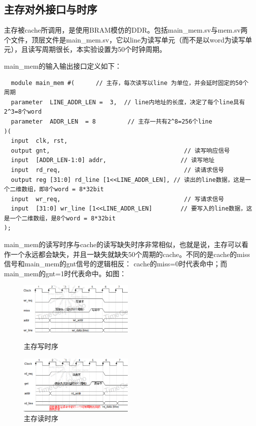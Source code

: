 \documentclass{ctexart}
\begin{document}
\subsection{\hei 主存对外接口与时序}
主存被cache所调用，是使用BRAM模仿的DDR。包括main\_mem.sv与mem.sv两个文件，顶层文件是main\_mem.sv，它以line为读写单元（而不是以word为读写单元），且读写周期很长，本实验设置为50个时钟周期。
\par main\_mem的输入输出接口定义如下：
\begin{lstlisting}
  module main_mem #(      // 主存，每次读写以line 为单位，并会延时固定的50个周期
  parameter  LINE_ADDR_LEN =  3,  // line内地址的长度，决定了每个line具有2^3=8个word
  parameter  ADDR_LEN  = 8         // 主存一共有2^8=256个line
)(
  input  clk, rst,
  output gnt,                                      // 读写响应信号
  input  [ADDR_LEN-1:0] addr,                     // 读写地址
  input  rd_req,                                   // 读请求信号
  output reg [31:0] rd_line [1<<LINE_ADDR_LEN], // 读出的line数据，这是一个二维数组，即8个word = 8*32bit
  input  wr_req,                                   // 写请求信号
  input  [31:0] wr_line [1<<LINE_ADDR_LEN]        // 要写入的line数据，这是一个二维数组，是8个word = 8*32bit
);

\end{lstlisting}\par
main\_mem的读写时序与cache的读写缺失时序非常相似，也就是说，主存可以看作一个永远都会缺失，并且一缺失就缺失50个周期的cache。不同的是cache的miss信号和main\_mem的gnt信号的逻辑相反：
cache的miss=0时代表命中；而main\_mem的gnt=1时代表命中。如图：\par
\begin{figure}[H]
    \begin{minipage}[t]{0.5\linewidth}
        \centering
        \includegraphics[width=2.2in]{zcx.png}
        \caption{主存写时序}
        \label{fig:side:a2}
    \end{minipage}%
    \begin{minipage}[t]{0.5\linewidth}
        \centering
        \includegraphics[width=2.2in]{zcd.png}
        \caption{主存读时序}
        \label{fig:side:b2}
    \end{minipage}
\end{figure}
\par
\end{document}

